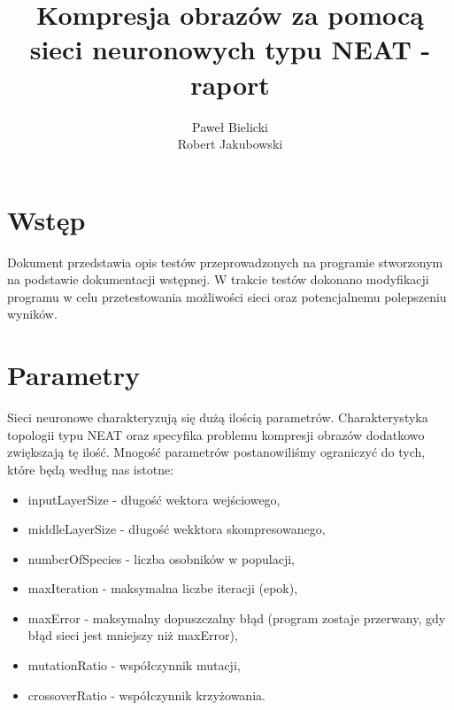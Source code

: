 \documentclass[12pt,a4paper,oneside]{article}
\begin{document}
\begin{titlepage}
\title{ Kompresja obrazów za pomocą sieci neuronowych typu NEAT - raport}
\maketitle


\begin{flushright}
\author{
\bigskip
Paweł Bielicki
\\Robert Jakubowski}
\end{flushright}

\end{titlepage}

\section{Wstęp}
Dokument przedstawia opis testów przeprowadzonych na programie stworzonym na podstawie dokumentacji wstępnej. W trakcie testów dokonano modyfikacji programu w celu przetestowania możliwości sieci oraz potencjalnemu polepszeniu wyników.

\section{Parametry}
Sieci neuronowe charakteryzują się dużą ilością parametrów. Charakterystyka topologii typu NEAT oraz specyfika problemu kompresji obrazów dodatkowo zwiększają tę ilość. Mnogość parametrów postanowiliśmy ograniczyć do tych, które będą według nas istotne:
\begin{itemize}
	\item inputLayerSize - długość wektora wejściowego,
	\item middleLayerSize - długość wekktora skompresowanego,
	\item numberOfSpecies - liczba osobników w populacji,
	\item maxIteration - maksymalna liczbe iteracji (epok),
	\item maxError - maksymalny dopuszczalny błąd (program zostaje przerwany, gdy błąd sieci jest mniejszy niż maxError),
	\item mutationRatio - współczynnik mutacji,
	\item crossoverRatio - współczynnik krzyżowania.
\end{itemize}
\end{document}
